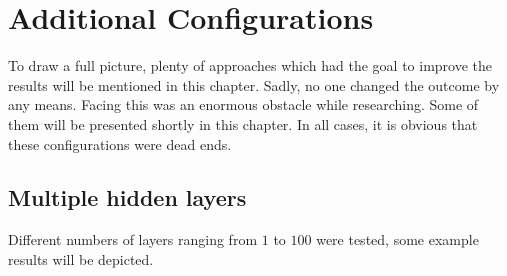\chapter{Additional Configurations} \label{ch: additional configurations}

To draw a full picture, plenty of approaches which had the goal to improve the results will be mentioned in this chapter. Sadly, no one changed the outcome by any means. Facing this was an enormous obstacle while researching. Some of them will be presented shortly in this chapter. In all cases, it is obvious that these configurations were dead ends.

\clearpage
\section{Multiple hidden layers} \label{subsubsec: multiple hidden layers}
Different numbers of layers ranging from $ 1 $ to $ 100 $ were tested, some example results will be depicted.
\newcommand{\hh}{0.365\textheight}
%
